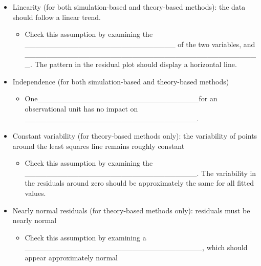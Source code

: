 \documentclass[
]{report}
\providecommand{\tightlist}{%
  \setlength{\itemsep}{0pt}\setlength{\parskip}{0pt}}
\begin{document}

\begin{itemize}
\item
  Linearity (for both simulation-based and theory-based methods): the data should follow a linear trend.

  \begin{itemize}
  \tightlist
  \item
    Check this assumption by examining the \_\_\_\_\_\_\_\_\_\_\_\_\_\_\_\_\_\_\_\_\_\_\_\_\_\_\_\_ of the two variables, and \_\_\_\_\_\_\_\_\_\_\_\_\_\_\_\_\_\_\_\_\_\_\_\_\_\_\_\_\_\_\_\_\_\_\_\_\_\_\_\_\_\_\_\_. The pattern in the residual plot should display a horizontal line.
  \end{itemize}
\item
  Independence (for both simulation-based and theory-based methods)

  \begin{itemize}
  \tightlist
  \item
    One\_\_\_\_\_\_\_\_\_\_\_\_\_\_\_\_\_\_\_\_\_\_\_\_\_\_\_\_\_\_for an observational unit has no impact on \_\_\_\_\_\_\_\_\_\_\_\_\_\_\_\_\_\_\_\_\_\_\_\_\_\_\_\_\_\_\_\_.
  \end{itemize}
\item
  Constant variability (for theory-based methods only): the variability of points around the least squares line remains roughly constant

  \begin{itemize}
  \tightlist
  \item
    Check this assumption by examining the \_\_\_\_\_\_\_\_\_\_\_\_\_\_\_\_\_\_\_\_\_\_\_\_\_\_\_\_\_\_\_\_. The variability in the residuals around zero should be approximately the same for all fitted values.
  \end{itemize}
\end{itemize}

\newpage

\begin{itemize}
\item
  Nearly normal residuals (for theory-based methods only): residuals must be nearly normal

  \begin{itemize}
  \tightlist
  \item
    Check this assumption by examining a \_\_\_\_\_\_\_\_\_\_\_\_\_\_\_\_\_\_\_\_\_\_\_\_\_\_\_\_\_\_\_\_\_, which should appear approximately normal
  \end{itemize}
\end{itemize}
\end{document}
